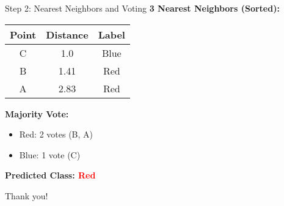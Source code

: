 \documentclass{beamer}
\begin{document}
\begin{frame}{Step 2: Nearest Neighbors and Voting}
\small
\textbf{3 Nearest Neighbors (Sorted):}

\begin{tabular}{|c|c|c|}
\hline
Point & Distance & Label \\
\hline
C & 1.0 & Blue \\
B & 1.41 & Red \\
A & 2.83 & Red \\
\hline
\end{tabular}

\vspace{0.4cm}
\textbf{Majority Vote:}
\begin{itemize}
  \item Red: 2 votes (B, A)
  \item Blue: 1 vote (C)
\end{itemize}

\vspace{0.2cm}
\textbf{Predicted Class: \textcolor{red}{Red}}
\end{frame}


\begin{frame}[standout]
    Thank you!
\end{frame}
\end{document}
